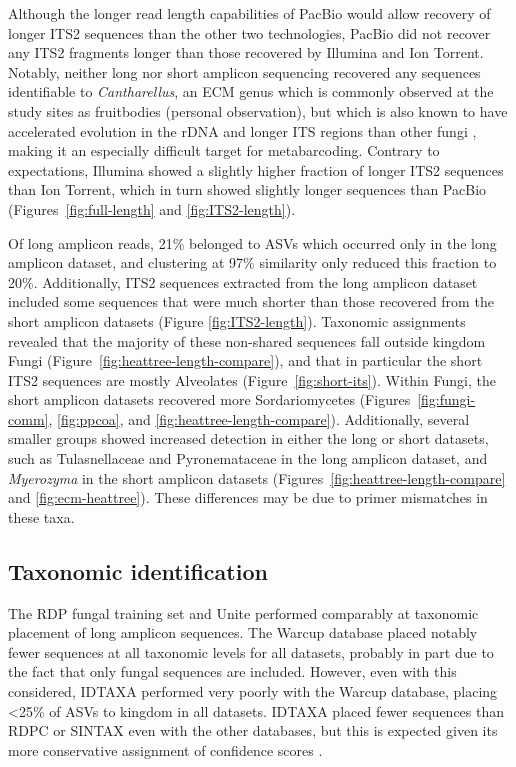 \documentclass[
  12pt,
]{article}
\begin{document}
Although the longer read length capabilities of PacBio would allow recovery of longer ITS2 sequences than the other two technologies, PacBio did not recover any ITS2 fragments longer than those recovered by Illumina and Ion Torrent.
Notably, neither long nor short amplicon sequencing recovered any sequences identifiable to \emph{Cantharellus}, an ECM genus which is commonly observed at the study sites as fruitbodies (personal observation), but which is also known to have accelerated evolution in the rDNA \autocite{moncalvo2006} and longer ITS regions than other fungi \autocite{Feibelman_1994}, making it an especially difficult target for metabarcoding.
Contrary to expectations, Illumina showed a slightly higher fraction of longer ITS2 sequences than Ion Torrent, which in turn showed slightly longer sequences than PacBio (Figures~\ref{fig:full-length} and \ref{fig:ITS2-length}).

Of long amplicon reads, 21\% belonged to ASVs which occurred only in the long amplicon dataset, and clustering at 97\% similarity only reduced this fraction to 20\%.
Additionally, ITS2 sequences extracted from the long amplicon dataset included some sequences that were much shorter than those recovered from the short amplicon datasets (Figure \ref{fig:ITS2-length}).
Taxonomic assignments revealed that the majority of these non-shared sequences fall outside kingdom Fungi (Figure~\ref{fig:heattree-length-compare}), and that in particular the short ITS2 sequences are mostly Alveolates (Figure~\ref{fig:short-its}).
Within Fungi, the short amplicon datasets recovered more Sordariomycetes (Figures~\ref{fig:fungi-comm}, \ref{fig:ppcoa}, and \ref{fig:heattree-length-compare}).
Additionally, several smaller groups showed increased detection in either the long or short datasets, such as Tulasnellaceae and Pyronemataceae in the long amplicon dataset, and \emph{Myerozyma} in the short amplicon datasets (Figures~\ref{fig:heattree-length-compare} and \ref{fig:ecm-heattree}).
These differences may be due to primer mismatches in these taxa.

\hypertarget{taxonomic-identification}{%
\subsection{Taxonomic identification}\label{taxonomic-identification}}

The RDP fungal training set and Unite performed comparably at taxonomic placement of long amplicon sequences.
The Warcup database placed notably fewer sequences at all taxonomic levels for all datasets, probably in part due to the fact that only fungal sequences are included.
However, even with this considered, IDTAXA performed very poorly with the Warcup database, placing \textless25\% of ASVs to kingdom in all datasets.
IDTAXA placed fewer sequences than RDPC or SINTAX even with the other databases, but this is expected given its more conservative assignment of confidence scores \autocite{murali2018a}.
\end{document}
